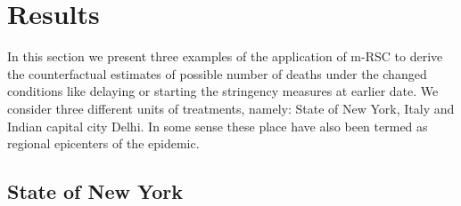 \documentclass[preprint,authoryear,12pt]{elsarticle}
\begin{document}
\section{Results}
\label{SEC4}
In this section we present three examples of the application of m-RSC to derive the counterfactual estimates of possible number of deaths under the changed conditions like delaying or starting the stringency measures at earlier date. We consider three different units of treatments, namely: State of New York, Italy and Indian capital city Delhi. In some sense these place have also been termed as regional epicenters of the epidemic.

	\subsection{State of New York}
	
\end{document}
